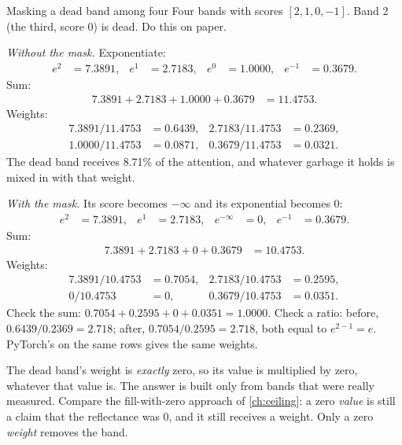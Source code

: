 \begin{worked}[label={we:crossstem:mask4}]{Masking a dead band among four}
Four bands with scores $[2, 1, 0, -1]$. Band 2 (the third, score 0) is dead. Do this on paper.

\emph{Without the mask.} Exponentiate:
\begin{align*}
  e^{2} &= 7.3891, & e^{1} &= 2.7183, & e^{0} &= 1.0000, & e^{-1} &= 0.3679 .
\end{align*}
Sum:
\begin{align*}
  7.3891 + 2.7183 + 1.0000 + 0.3679 &= 11.4753 .
\end{align*}
Weights:
\begin{align*}
  7.3891/11.4753 &= 0.6439, & 2.7183/11.4753 &= 0.2369,\\
  1.0000/11.4753 &= 0.0871, & 0.3679/11.4753 &= 0.0321 .
\end{align*}
The dead band receives 8.71\% of the attention, and whatever garbage it holds is mixed in with that weight.

\emph{With the mask.} Its score becomes $-\infty$ and its exponential becomes 0:
\begin{align*}
  e^{2} &= 7.3891, & e^{1} &= 2.7183, & e^{-\infty} &= 0, & e^{-1} &= 0.3679 .
\end{align*}
Sum:
\begin{align*}
  7.3891 + 2.7183 + 0 + 0.3679 &= 10.4753 .
\end{align*}
Weights:
\begin{align*}
  7.3891/10.4753 &= 0.7054, & 2.7183/10.4753 &= 0.2595,\\
  0/10.4753 &= 0, & 0.3679/10.4753 &= 0.0351 .
\end{align*}
Check the sum: $0.7054 + 0.2595 + 0 + 0.0351 = 1.0000$. Check a ratio: before, $0.6439/0.2369 = 2.718$; after, $0.7054/0.2595 = 2.718$, both equal to $e^{2-1} = e$. PyTorch's  on the same rows gives the same weights\tagC{}.
\end{worked}

The dead band's weight is \emph{exactly} zero, so its value is multiplied by zero, whatever that value is. The answer is built only from bands that were really measured. Compare the fill-with-zero approach of \cref{ch:ceiling}: a zero \emph{value} is still a claim that the reflectance was 0, and it still receives a weight. Only a zero \emph{weight} removes the band.


